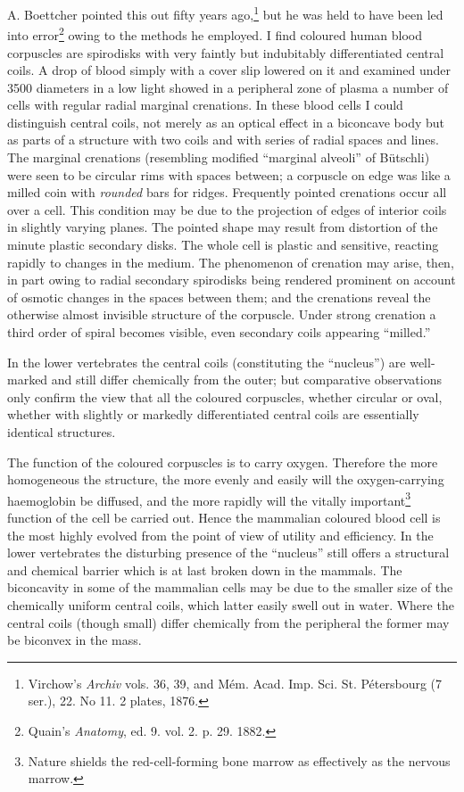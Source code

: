 \documentclass[a4paper, 12pt, oneside, landscape]{article}
\begin{document}
A. Boettcher pointed this out fifty years ago,\footnote{Virchow's \emph{Archiv} vols. 36, 39, and Mém. Acad. Imp. Sci. St. Pétersbourg (7 ser.), 22. No 11. 2 plates, 1876.} but he was held to have been led into error\footnote{Quain's \emph{Anatomy}, ed. 9. vol. 2. p. 29. 1882.} owing to the methods he employed. I find coloured human blood corpuscles are spirodisks with very faintly but indubitably differentiated central coils. A drop of blood simply with a cover slip lowered on it and examined under 3500 diameters in a low light showed in a peripheral zone of plasma a number of cells with regular radial marginal crenations. In these blood cells I could distinguish central coils, not merely as an optical effect in a biconcave body but as parts of a structure with two coils and with series of radial spaces and lines. The marginal crenations (resembling modified ``marginal alveoli'' of Bütschli) were seen to be circular rims with spaces between; a corpuscle on edge was like a milled coin with \emph{rounded} bars for ridges. Frequently pointed crenations occur all over a cell. This condition may be due to the projection of edges of interior coils in slightly varying planes. The pointed shape may result from distortion of the minute plastic secondary disks. The whole cell is plastic and sensitive, reacting rapidly to changes in the medium. The phenomenon of crenation may arise, then, in part owing to radial secondary spirodisks being rendered prominent on account of osmotic changes in the spaces between them; and the crenations reveal the otherwise almost invisible structure of the corpuscle. Under strong crenation a third order of spiral becomes visible, even secondary coils appearing ``milled.''

In the lower vertebrates the central coils (constituting the ``nucleus'') are well-marked and still differ chemically from the outer; but comparative observations only confirm the view that all the coloured corpuscles, whether circular or oval, whether with slightly or markedly differentiated central coils are essentially identical structures.

The function of the coloured corpuscles is to carry oxygen. Therefore the more homogeneous the structure, the more evenly and easily will the oxygen-carrying haemoglobin be diffused, and the more rapidly will the vitally important\footnote{Nature shields the red-cell-forming bone marrow as effectively as the nervous marrow.} function of the cell be carried out. Hence the mammalian coloured blood cell is the most highly evolved from the point of view of utility and efficiency. In the lower vertebrates the disturbing presence of the ``nucleus'' still offers a structural and chemical barrier which is at last broken down in the mammals. The biconcavity in some of the mammalian cells may be due to the smaller size of the chemically uniform central coils, which latter easily swell out in water. Where the central coils (though small) differ chemically from the peripheral the former may be biconvex in the mass.
\end{document}
